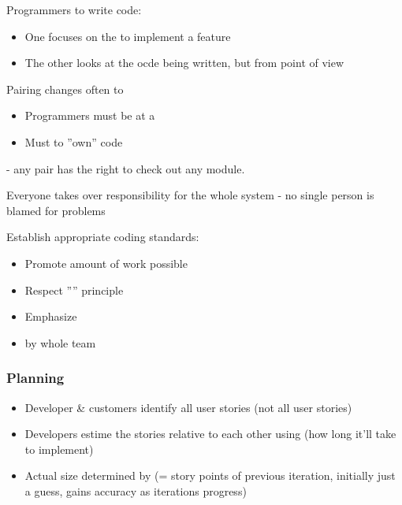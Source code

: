 \documentclass[
    ../../Software_Engineering_Summary.tex,
]
{subfiles}
\begin{document}
\begin{defbox}
    Programmers  to write code:
    \begin{itemize}
        \item One focuses on the  to implement a feature
        \item The other looks at the ocde being written, but from  point of view
    \end{itemize}

    Pairing changes often to 

    \vspace{5pt}
    \begin{itemize}
        \item Programmers must be at a 
        \item Must  to ''own'' code
    \end{itemize}
\end{defbox}

\begin{defbox}
     - any pair has the right to check out any module.

    Everyone takes over responsibility for the whole system - no single person is blamed for problems
\end{defbox}

\begin{defbox}
    Establish appropriate coding standards:
    \begin{itemize}
        \item Promote  amount of work possible
        \item Respect '''' principle
        \item Emphasize 
        \item {} by whole team
    \end{itemize}
\end{defbox}

\subsubsection{Planning}
\begin{defbox}
    \begin{itemize}
        \item Developer \& customers identify all  user stories (not all user stories)
        \item Developers estime the stories relative to each other using  (how long it'll take to implement)
        \item Actual size determined by  (= story points of previous iteration, initially just a guess, gains accuracy as iterations progress)
    \end{itemize}
\end{defbox}
\end{document}
